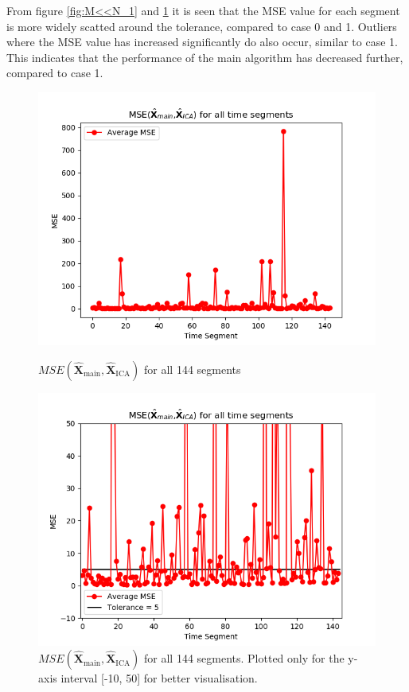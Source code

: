 From figure \ref{fig:M<<N_1} and \ref{fig:M<<N_1_2} it is seen that the MSE value for each segment is more widely scatted around the tolerance, compared to case 0 and 1. Outliers where the MSE value has increased significantly do also occur, similar to case 1. This indicates that the performance of the main algorithm has decreased further, compared to case 1. 

\begin{figure}[H]
\begin{widepage}
    \begin{minipage}[t]{.45\textwidth}
		\centering
		\includegraphics[width=1\linewidth]{figures/ch_7/average_mse_second_removed_ica}
	\caption{$MSE\left(\hat{\mathbf{X}}_{\text{main}},\hat{\mathbf{X}}_{\text{ICA}}\right)$ for all 144 segments}
	\label{fig:M<<N_1}
    \end{minipage} 
\hspace{0.5cm}
    \begin{minipage}[t]{.45\textwidth}
        \centering
		\includegraphics[width=1\linewidth]{figures/ch_7/average_mse_second_removed_ica_zoom.png}
	\caption{$MSE\left(\hat{\mathbf{X}}_{\text{main}},\hat{\mathbf{X}}_{\text{ICA}}\right)$ for all 144 segments. Plotted only for the y-axis interval [-10, 50] for better visualisation.}
	\label{fig:M<<N_1_2}
    \end{minipage}
\end{widepage}
\end{figure}
